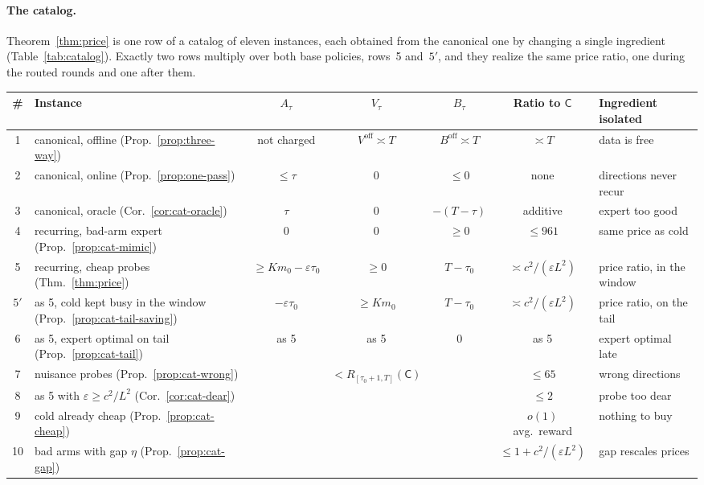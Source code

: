 \documentclass{article}
\theoremstyle{definition}
\theoremstyle{remark}
\newcommand{\eps}{\varepsilon}
\theoremstyle{remark}
\newcommand{\Cold}{\mathsf{C}}
\begin{document}
\paragraph{The catalog.}
Theorem~\ref{thm:price} is one row of a catalog of eleven instances, each
obtained from the canonical one by changing a single ingredient
(Table~\ref{tab:catalog}). Exactly two rows multiply over both base policies,
rows~5 and~$5'$, and they realize the same price ratio, one during the routed
rounds and one after them.

\begin{table}[t]
\centering
\scriptsize
\setlength{\tabcolsep}{2.5pt}
\begin{tabular}{@{}clccccl@{}}
\toprule
\# & Instance & $A_\tau$ & $V_\tau$ & $B_\tau$ & Ratio to $\Cold$ & Ingredient isolated\\
\midrule
1 & canonical, offline (Prop.~\ref{prop:three-way}) & not charged & $V^{\mathrm{off}}\asymp T$ & $B^{\mathrm{off}}\asymp T$ & $\asymp T$ & data is free\\
2 & canonical, online (Prop.~\ref{prop:one-pass}) & $\le\tau$ & $0$ & $\le0$ & none & directions never recur\\
3 & canonical, oracle (Cor.~\ref{cor:cat-oracle}) & $\tau$ & $0$ & $-(T-\tau)$ & additive & expert too good\\
4 & recurring, bad-arm expert (Prop.~\ref{prop:cat-mimic}) & $0$ & $0$ & $\ge0$ & $\le961$ & same price as cold\\
5 & recurring, cheap probes (Thm.~\ref{thm:price}) & $\ge Km_0-\eps\tau_0$ & $\ge0$ & $T-\tau_0$ & $\asymp c^2/(\eps L^2)$ & price ratio, in the window\\
$5'$ & as 5, cold kept busy in the window (Prop.~\ref{prop:cat-tail-saving}) & $-\eps\tau_0$ & $\ge Km_0$ & $T-\tau_0$ & $\asymp c^2/(\eps L^2)$ & price ratio, on the tail\\
6 & as 5, expert optimal on tail (Prop.~\ref{prop:cat-tail}) & as 5 & as 5 & $0$ & as 5 & expert optimal late\\
7 & nuisance probes (Prop.~\ref{prop:cat-wrong}) & & $<R_{[\tau_0+1,T]}(\Cold)$ & & $\le65$ & wrong directions\\
8 & as 5 with $\eps\ge c^2/L^2$ (Cor.~\ref{cor:cat-dear}) & & & & $\le2$ & probe too dear\\
9 & cold already cheap (Prop.~\ref{prop:cat-cheap}) & & & & $o(1)$ avg.\ reward & nothing to buy\\
10 & bad arms with gap $\eta$ (Prop.~\ref{prop:cat-gap}) & & & & $\le1+c^2/(\eps L^2)$ & gap rescales prices\\

\end{tabular}
\end{table}
\end{document}
